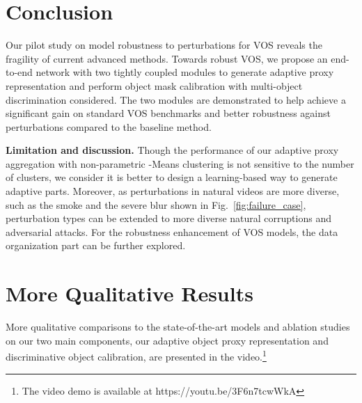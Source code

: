 \documentclass[sigconf]{acmart}
\begin{document}
 \section{Conclusion}
\label{sec:Conclusion}
Our pilot study on model robustness to perturbations for VOS reveals the fragility of current advanced methods. Towards robust VOS, we propose an end-to-end network with two tightly coupled modules to generate adaptive proxy representation and perform object mask calibration with multi-object discrimination considered. 
The two modules are demonstrated to help achieve a significant gain on standard VOS benchmarks and better robustness against perturbations compared to the baseline method.

\noindent\textbf{Limitation and discussion.}
Though the performance of our adaptive proxy aggregation with non-parametric -Means clustering is not sensitive to the number of clusters, we consider it is better to design a learning-based way to generate adaptive parts. Moreover, as perturbations in natural videos are more diverse, such as the smoke and the severe blur shown in Fig.~\ref{fig:failure_case}, perturbation types can be extended to more diverse natural corruptions and adversarial attacks. For the robustness enhancement of VOS models, the data organization part can be further explored.
 \clearpage



\clearpage

\setcounter{table}{0}  
\setcounter{figure}{0}  
\setcounter{section}{0}  
\renewcommand{\thetable}{\Alph{table}}
\renewcommand{\thefigure}{\Alph{figure}}
\renewcommand{\thesection}{\Alph{section}}

\section{More Qualitative Results}

More qualitative comparisons to the state-of-the-art models \cite{cheng2021rethinking,yang2020collaborative,oh2019video} and ablation studies on our two main components, our adaptive object proxy representation and discriminative object calibration, are presented in the video.\footnote{The video demo is available at https://youtu.be/3F6n7tcwWkA}
\end{document}
